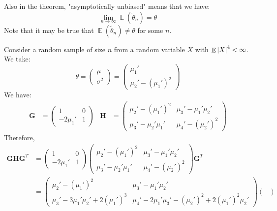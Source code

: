 \documentclass{huhtakm-template-book-v2}
\DeclareMathOperator{\E}{\mathbb{E}}
\begin{document}
\newpage
\begin{rem}
	Also in the theorem, "asymptotically unbiased" means that we have:
	\begin{equation*}
		\lim_{n\to\infty}\E(\widetilde{\theta}_{n})=\theta
	\end{equation*}
	Note that it may be true that $\E(\widetilde{\theta}_{n})\neq\theta$ for some $n$.
\end{rem}
\begin{eg}
	Consider a random sample of size $n$ from a random variable $X$ with $\E\abs{X}^{4}<\infty$. We take:
	\begin{equation*}
		\theta=\begin{pmatrix}
			\mu\\ \sigma^{2}
		\end{pmatrix}=\begin{pmatrix}
			\mu_{1}'\\ \mu_{2}'-(\mu_{1}')^{2}
		\end{pmatrix}
	\end{equation*}
	We have:
	\begin{align*}
		\mathbf{G}&=\begin{pmatrix}
			1 & 0\\
			-2\mu_{1}' & 1
		\end{pmatrix} & \mathbf{H}&=\begin{pmatrix}
			\mu_{2}'-(\mu_{1}')^{2} & \mu_{3}'-\mu_{1}'\mu_{2}'\\
			\mu_{3}'-\mu_{2}'\mu_{1}' & \mu_{4}'-(\mu_{2}')^{2}
		\end{pmatrix}
	\end{align*}
	Therefore,
	\begin{align*}
		\mathbf{GHG}^{T}&=\begin{pmatrix}
			1 & 0\\
			-2\mu_{1}' & 1
		\end{pmatrix}\begin{pmatrix}
		\mu_{2}'-(\mu_{1}')^{2} & \mu_{3}'-\mu_{1}'\mu_{2}'\\
		\mu_{3}'-\mu_{2}'\mu_{1}' & \mu_{4}'-(\mu_{2}')^{2}
		\end{pmatrix}\mathbf{G}^{T}\\
		&=\begin{pmatrix}
			\mu_{2}'-(\mu_{1}')^{2} & \mu_{3}'-\mu_{1}'\mu_{2}'\\
			\mu_{3}'-3\mu_{1}'\mu_{2}'+2(\mu_{1}')^{3} & \mu_{4}'-2\mu_{1}'\mu_{3}'-(\mu_{2}')^{2}+2(\mu_{1}')^{2}\mu_{2}'
		\end{pmatrix}\begin{pmatrix}

\end{pmatrix}
\end{align*}
\end{eg}
\end{document}
